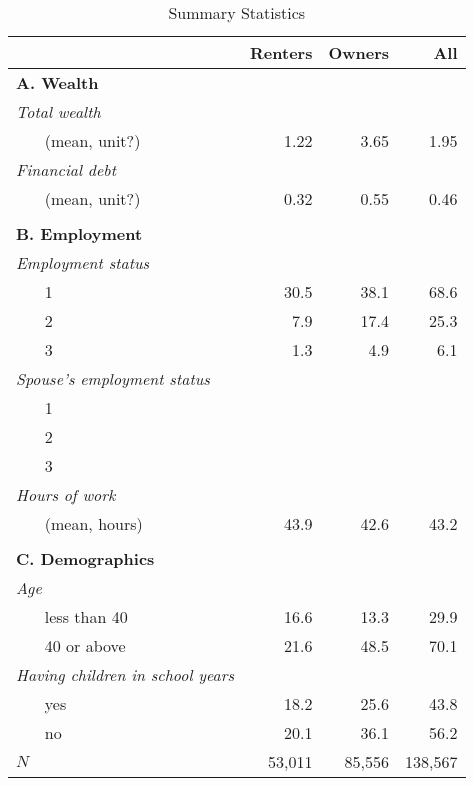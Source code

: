 \documentclass[10pt]{article}
\theoremstyle{definition}
\theoremstyle{remark}
\begin{document}
\begin{table}[pt]
    \centering
    \caption{Summary Statistics}
    \label{tab:sum_stat}
    \begin{tabular}{llrrr}
        \toprule
        &  & Renters & Owners & All \\
        \midrule
        \multicolumn{4}{l}{\textbf{A. Wealth}} \\
        \multicolumn{2}{l}{\textit{Total wealth}} \\
        & (mean, unit?) & 1.22 & 3.65 & 1.95 \\
        \multicolumn{2}{l}{\textit{Financial debt}} \\
        & (mean, unit?) & 0.32 & 0.55 & 0.46 \\
        \phantom{} \\
        \multicolumn{4}{l}{\textbf{B. Employment}} \\
        \multicolumn{2}{l}{\textit{Employment status}} \\
        & 1 & 30.5 & 38.1 & 68.6 \\
        & 2 & 7.9 & 17.4 & 25.3 \\
        & 3 & 1.3 & 4.9 & 6.1 \\
        \multicolumn{2}{l}{\textit{Spouse's employment status}} \\
        & 1 &  \\
        & 2 &  \\
        & 3 &  \\
        \multicolumn{2}{l}{\textit{Hours of work}} \\
        & (mean, hours) & 43.9 & 42.6 & 43.2 \\
        \phantom{} \\
        \multicolumn{4}{l}{\textbf{C. Demographics}} \\
        \multicolumn{2}{l}{\textit{Age}} \\
        & less than 40 & 16.6 & 13.3 & 29.9 \\
        & 40 or above & 21.6 & 48.5 & 70.1 \\
        \multicolumn{2}{l}{\textit{Having children in school years}} \\
        & yes & 18.2 & 25.6 & 43.8 \\
        & no & 20.1 & 36.1 & 56.2 \\
        \midrule
        \multicolumn{2}{l}{$N$} & 53,011 & 85,556 & 138,567 \\
        \bottomrule
    \end{tabular}
\end{table}
\end{document}
